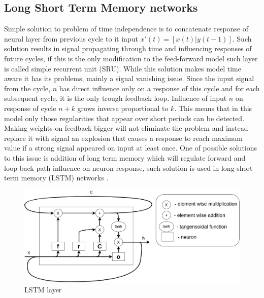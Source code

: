 \documentclass{article}
\begin{document}
\subsection{Long Short Term Memory networks}
Simple solution to problem of time independence is to concatenate response of neural layer
from previous cycle to it input $x'(t)=[x(t)|y(t-1)]$.
Such solution results in signal propagating through time and influencing responses of future cycles,
if this is the only modification to the feed-forward model such layer is called simple recurrent
unit (SRU).
While this solution makes model time aware it has its problems, mainly a signal vanishing
issue. Since the input signal from the cycle, $n$ has direct influence only on a response of this
cycle and for each subsequent cycle, it is the only trough feedback loop. Influence of input $n$ on
response of cycle $n+k$ grows inverse proportional to $k$.
This means that in this model only those regularities that appear over short periods can
be detected.
Making weights on feedback bigger will not eliminate the problem and instead replace it with signal
an explosion that causes a response to reach maximum value if a strong signal appeared on input at
least once.
One of possible solutions to this issue is addition of long term memory which will regulate
forward and loop back path influence on neuron response, such solution is used in long short
term memory (LSTM) networks \cite{Hochreiter1997}.
\begin{figure}[htb] 
\centering
	\includegraphics[width=\textwidth]{figures/lstm}
\caption{LSTM layer}
\label{fig:lstm}
\end{figure}

\end{document}
